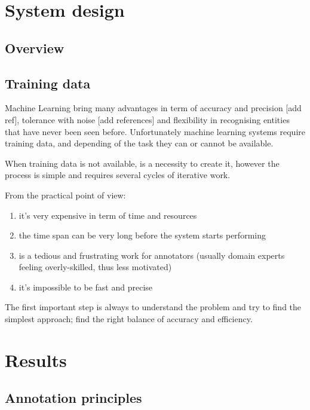 \documentclass{article}
\begin{document}
\section{System design}

\subsection{Overview}

\subsection{Training data}

Machine Learning bring many advantages in term of accuracy and precision [add ref], tolerance with noise [add references] and flexibility in recognising entities that have never been seen before. 
Unfortunately machine learning systems require training data, and depending of the task they can or cannot be available.

When training data is not available, is a necessity to create it, however the process is simple and requires several cycles of iterative work.

From the practical point of view:  
\begin{enumerate}
    \item it's very expensive in term of time and resources
    \item the time span can be very long before the system starts performing
    \item is a tedious and frustrating work for annotators (usually domain experts feeling overly-skilled, thus less motivated)
    \item it's impossible to be fast and precise 
\end{enumerate}
    
The first important step is always to understand the problem and try to find the simplest approach; find the right balance of accuracy and efficiency. 

\section{Results}

\subsection{Annotation principles}
\end{document}
